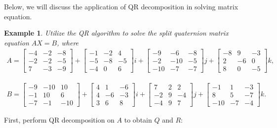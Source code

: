 \documentclass[1p]{elsarticle}
\newtheorem{example}[theorem]{Example}
\numberwithin{equation}{section}
\begin{document}
Below, we will discuss the application of QR decomposition in solving matrix equation.
\begin{example}
Utilize the QR algorithm to solve the split quaternion matrix equation $AX = B$, where
\begin{align*}
A =
\begin{bmatrix}
-4 & -2 & -8 \\
-2 & -2 & -5 \\
7 & -3 & -9
\end{bmatrix} +
\begin{bmatrix}
-1 & -2 & 4 \\
-5 & -8 & -5 \\
-4 & 0 & 6
\end{bmatrix} i 
+ 
\begin{bmatrix}
-9 & -6 & -8 \\
-2 & -10 & -5 \\
-10 & -7 & -7
\end{bmatrix} j +
\begin{bmatrix}
-8 & 9 & -3 \\
2 & -6 & 0 \\
8 & 0 & -5
\end{bmatrix} k,
\end{align*}

\begin{align*}
B =
\begin{bmatrix}
-9 & -10 & 10 \\
-1 & 10 & 6 \\
-7 & -1 & -10
\end{bmatrix} +
\begin{bmatrix}
4 & 1 & -6 \\
4 & -6 & -3 \\
3 & 6 & 8
\end{bmatrix} i 
+
\begin{bmatrix}
7 & 2 & 2 \\
-2 & 9 & -4 \\
-4 & 9 & 7
\end{bmatrix} j +
\begin{bmatrix}
-1 & 1 & -3 \\
8 & 5 & -7 \\
-10 & -7 & -4
\end{bmatrix} k.
\end{align*}
\end{example}  
First, perform QR decomposition on $A$ to obtain $Q$ and $R:$
\end{document}
